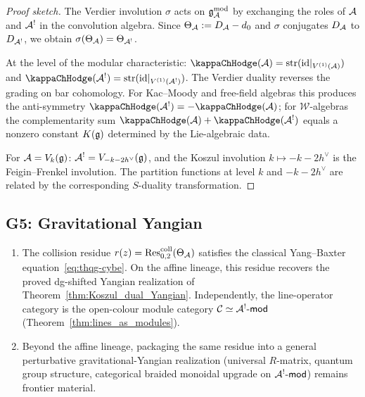 \begin{proof}[Proof sketch]
The Verdier involution $\sigma$ acts on $\mathfrak{g}_{\mathcal{A}}^{\mathrm{mod}}$ by exchanging the
roles of $\mathcal{A}$ and $\mathcal{A}^!$ in the convolution algebra. Since
$\Theta_{\mathcal{A}} := D_{\mathcal{A}} - d_0$ and $\sigma$ conjugates $D_{\mathcal{A}}$ to
$D_{\mathcal{A}^!}$, we obtain $\sigma(\Theta_{\mathcal{A}}) = \Theta_{\mathcal{A}^!}$.

At the level of the modular characteristic:
$\kappaChHodge(\cA) = \operatorname{str}(\id|_{V^{(1)}(\cA)})$ and
$\kappaChHodge(\cA^!) = \operatorname{str}(\id|_{V^{(1)}(\cA^!)})$.
The Verdier duality reverses the grading on bar cohomology.
For Kac--Moody and free-field algebras this produces the
anti-symmetry $\kappaChHodge(\cA^!) = -\kappaChHodge(\cA)$; for $\mathcal{W}$-algebras
the complementarity sum $\kappaChHodge(\cA) + \kappaChHodge(\cA^!)$ equals a nonzero
constant $K(\mathfrak{g})$ determined by the Lie-algebraic data.

For $\mathcal{A} = V_k(\mathfrak{g})$:
$\mathcal{A}^! = V_{-k-2h^\vee}(\mathfrak{g})$, and the Koszul involution
$k \mapsto -k - 2h^\vee$ is the Feigin--Frenkel involution. The
partition functions at level $k$ and $-k - 2h^\vee$ are related by
the corresponding $S$-duality transformation.
\end{proof}


\subsection{G5: Gravitational Yangian}

\begin{theorem}
\begin{enumerate}[label=\textup{(\alph*)}]
\item \ClaimStatusConditional\;%
 The collision residue $r(z) = \operatorname{Res}^{\mathrm{coll}}_{0,2}(\Theta_{\mathcal{A}})$
 satisfies the classical Yang--Baxter
 equation~\eqref{eq:thqg-cybe}.
 On the affine lineage, this residue recovers the proved
 dg-shifted Yangian realization of
 Theorem~\textup{\ref{thm:Koszul_dual_Yangian}}.
 Independently, the line-operator category is the
 open-colour module category
 $\mathcal{C} \simeq \mathcal{A}^!\text{-}\mathsf{mod}$
 \textup{(}Theorem~\textup{\ref{thm:lines_as_modules}}\textup{)}.
\item \ClaimStatusConjectured\;%
 Beyond the affine lineage, packaging the same residue
 into a general perturbative gravitational-Yangian
 realization \textup{(}universal $R$-matrix, quantum
 group structure, categorical braided monoidal upgrade on
 $\mathcal{A}^!\text{-}\mathsf{mod}$\textup{)} remains frontier
 material.
\end{enumerate}
\end{theorem}

